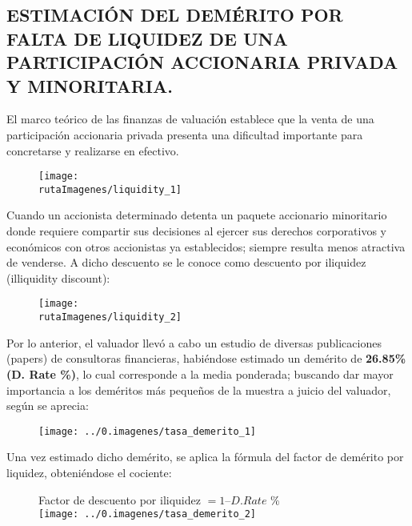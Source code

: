 \newcommand{\valorIliquidezM}{1}
\newcommand{\valorIliquidezm}{984}
\newcommand{\valorIliquidezc}{766}
\newcommand{\valorIliquidez}{\valorIliquidezM,\valorIliquidezm,\valorIliquidezc}
\newcommand{\valorIliquidezLetra}{\Numberstringnum{\valorIliquidezM}{} millones, \numberstringnum{\valorIliquidezm}{} mil, \numberstringnum{\valorIliquidezc}}


\subsection{ESTIMACI\'ON DEL DEM\'ERITO POR FALTA DE LIQUIDEZ DE UNA PARTICIPACIÓN ACCIONARIA PRIVADA Y MINORITARIA.}

El marco te\'orico de las finanzas de valuaci\'on establece que la venta de una participaci\'on accionaria privada presenta una dificultad importante para concretarse y realizarse en efectivo.

\begin{figure}[H]
\centering
\texttt{[image: \\rutaImagenes/liquidity\_1]}
\end{figure} 

Cuando un accionista determinado detenta un paquete accionario minoritario donde requiere compartir sus decisiones al ejercer sus derechos corporativos y econ\'omicos con otros accionistas ya establecidos; siempre resulta menos atractiva de venderse. A dicho descuento se le conoce como descuento por iliquidez (illiquidity discount):

\begin{figure}[H]
\centering
\texttt{[image: \\rutaImagenes/liquidity\_2]}
\end{figure} 

Por lo anterior, el valuador llev\'o a cabo un estudio de diversas publicaciones (papers) de consultoras financieras, habi\'endose estimado un dem\'erito de \textcolor{principal}{\textbf{26.85\% (D. Rate \%)}}, lo cual corresponde a la media ponderada; buscando dar mayor importancia a los dem\'eritos m\'as peque\~nos de la muestra a juicio del valuador, seg\'un se aprecia:

\begin{figure}[H]
\centering
\texttt{[image: ../0.imagenes/tasa\_demerito\_1]}
\end{figure} 

Una vez estimado dicho dem\'erito, se aplica la f\'ormula del factor de dem\'erito por liquidez, obteni\'endose el cociente: 

\begin{figure}[H]
\centering
Factor de descuento por iliquidez $= 1 – D. Rate$ \%\\

\texttt{[image: ../0.imagenes/tasa\_demerito\_2]}
\end{figure} 

